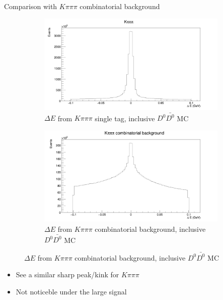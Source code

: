 \documentclass{beamer}
\begin{document}
\begin{frame}{Comparison with $K\pi\pi\pi$ combinatorial background}
  \begin{figure}
    \centering
    \begin{subfigure}{0.5\textwidth}
      \centering
      \includegraphics[width=\textwidth]{KpipipiDeltaE.png}
      \caption{$\Delta E$ from $K\pi\pi\pi$ single tag, inclusive $D^0\bar{D^0}$ MC}
    \end{subfigure}%
    \begin{subfigure}{0.5\textwidth}
      \centering
      \includegraphics[width=\textwidth]{KpipipiDeltaECombinatorial.png}
      \caption{$\Delta E$ from $K\pi\pi\pi$ combinatorial background, inclusive $D^0\bar{D^0}$ MC}
    \end{subfigure}
  \end{figure}
  \begin{itemize}
    \item{See a similar sharp peak/kink for $K\pi\pi\pi$}
    \item{Not noticeble under the large signal}
  \end{itemize}
\end{frame}
\end{document}
